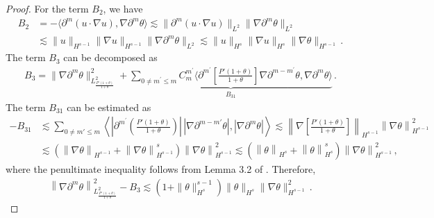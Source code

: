 \documentclass[reqno,11pt]{amsart}
\numberwithin{equation}{section}
\def\p{\partial}
\begin{document}
\begin{proof}
For the term $B_2$, we have
\begin{equation}\label{theta-eq3}
\begin{aligned}
 B_2 & = - \langle \partial^m (u \cdot \nabla u), \nabla \partial^m \theta \rangle \lesssim \| \partial^m (u \cdot \nabla u) \|_{L^2} \| \nabla \partial^m \theta \|_{L^2} \\
  & \lesssim \| u \|_{H^{s-1}} \| \nabla u \|_{H^{s-1}} \| \nabla\p^m \theta \|_{L^{2}} \lesssim \| u \|_{H^{s}} \| \nabla u \|_{H^s} \| \nabla \theta \|_{H^{s-1}} \,.
\end{aligned}
\end{equation}
The term $B_3$ can be decomposed as
\begin{equation*}
\begin{aligned}
B_{3} =\|\nabla\p^m\theta\|^2_{L^2_{ \frac{P' (1+\theta) }{ 1 + \theta } }} + \underbrace{ \sum_{0\neq m^\prime\leq m } C^{m^\prime}_m \langle \p^{m^\prime} [ \frac{ {P}' (1+\theta) }{ 1+\theta } ] \nabla \p^{m-m^\prime} \theta, \nabla \p^m \theta \rangle }_{B_{31}} \,.
\end{aligned}
\end{equation*}
The term $B_{31}$ can be estimated as
\begin{equation*}
\begin{aligned}
-B_{31}& \lesssim \sum_{0 \neq m' \leq m}\left\langle \left| \p^{m^\prime} ( \frac{ {P}' (1+\theta)}{1+\theta} ) \right| \, | \nabla\partial^{m-m'} \theta| ,  | \nabla \partial^{m} \theta | \right\rangle \lesssim \left\| \nabla \left[ \frac{ {P}' (1+\theta) }{ 1+\theta} \right] \right\|_{H^{s-1}} \left\| \nabla\theta \right\|_{H^{s-1}}^2 \\ 
& \lesssim \left( \left\| \nabla\theta \right\|_{H^{s-1}} + \left\| \nabla\theta \right\|^s_{H^{s-1}} \right) \left\| \nabla\theta \right\|_{H^{s-1}}^2 \lesssim \left( \left\|\theta \right\|_{H^s} + \left\| \theta \right\|^s_{H^s} \right) \left\| \nabla\theta \right\|_{H^{s-1}}^2 \,,
\end{aligned}
\end{equation*}
where the penultimate inequality follows from Lemma 3.2 of \cite{JLT-M3AS-2020}. Therefore,
\begin{equation}\label{theta-eq4}
\begin{aligned}
 \left\|\nabla \partial^m \theta\right\|_{L^2_\frac{ {P}' (1+\theta)}{1+\theta}}^2 - B_3 \lesssim (1 + \| \theta \|_{H^s}^{s-1}) \| \theta \|_{H^s} \| \nabla \theta \|^2_{H^{s-1}} \,.
\end{aligned}
\end{equation}


\end{proof}
\end{document}
